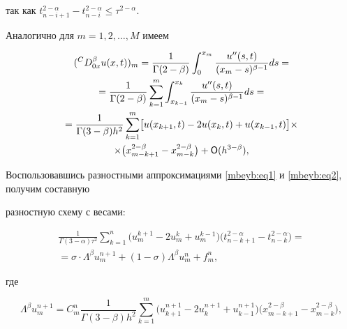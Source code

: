 так как $t_{n-i+1}^{2-\alpha } -t_{n-i}^{2-\alpha } \le \tau ^{2-\alpha }$. 



Аналогично для $m=1, 2, \dots, M$ имеем

\begin{multline}

\label{mbeyb:eq2}

({}^{C} D_{0x}^\beta u(x,t) )_m =

	\frac{1}{\Gamma (2-\beta )}

	\int_0^{x_m } \frac{u''(s, t)}{(x_m -s)^{\beta -1}}ds= \\

	=\frac{1}{\Gamma (2-\beta )} \sum\limits_{k=1}^m 

	\int_{x_{k-1} }^{x_k } \frac{u''(s,t)}{(x_m -s)^{\beta -1}}ds=

 \\ 

 =\frac{1}{\Gamma (3-\beta )h^2}\sum\limits_{k=1}^m 

 \bigl[ u(x_{k+1} ,t)-2u(x_k ,t)+u(x_{k-1} ,t)  \bigr] \times \\

 \times \bigl( x_{m-k+1}^{2-\beta } -x_{m-k}^{2-\beta }  \bigr)+{\sf O}(h^{3-\beta }), 

\end{multline}

Воспользовавшись разностными аппроксимациями \eqref{mbeyb:eq1} и \eqref{mbeyb:eq2}, получим составную 

разностную схему с весами:

\begin{multline}

\frac{1}{\Gamma (3-\alpha )\tau ^2}\sum\limits_{k=1}^n 

\bigl( u_m^{k+1}  -2u_m^k +u_m^{k-1}  \bigr) \bigl( t_{n-k+1}^{2-\alpha } -t_{n-k}^{2-\alpha }  \bigr)=

\\ =

\sigma \cdot \Lambda ^\beta u_m^{n+1}  +(1-\sigma )\Lambda ^\beta u_m^n +f_m^n ,

\end{multline}

где

\[

\Lambda ^\beta u_m^{n+1} =C_m^n \frac{1}{\Gamma (3-\beta )h^2

}\sum\limits_{k=1}^m 

\bigl( {u_{k+1}^{n+1} -2u_k^{n+1} +u_{k-1}^{n+1} } 

\bigr) 

\bigl( x_{m-k+1}^{2-\beta } -x_{m-k}^{2-\beta }  \bigr),

\]

